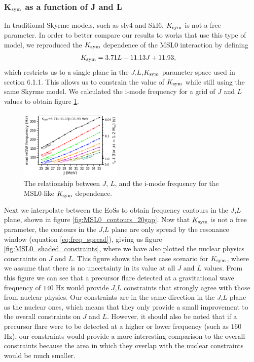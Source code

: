 \documentclass[fleqn,usenatbib]{mnras}
\begin{document}
\subsubsection{K$_{\rm sym}$ as a function of J and L}
\hspace{\parindent}In traditional Skyrme models, such as sly4 and SkI6, $K_{\rm sym}$ is not a free parameter. In order to better compare our results to works that use this type of model, we reproduced the $K_{\rm sym}$ dependence of the MSL0 interaction \citet{chen2010density} by defining \citet{newton2020nuclear}
\begin{align}
K_{\rm sym}=3.71L-11.13J+11.93,
\end{align}
\noindent which restricts us to a single plane in the $J$,$L$,$K_{\rm sym}$ parameter space used in section 6.1.1. This allows us to constrain the value of $K_{\rm sym}$ while still using the same Skyrme model. We calculated the i-mode frequency for a grid of $J$ and $L$ values to obtain figure \ref{fig:MSL0_J_L_f_tc}.

\begin{figure}
\centering
\includegraphics[width=0.45\textwidth,angle=0]{MSL0_J_L_f_tc}
\caption{The relationship between $J$, $L$, and the i-mode frequency for the MSL0-like $K_{\rm sym}$ dependence.}
\label{fig:MSL0_J_L_f_tc}
\end{figure}

\hspace{\parindent}Next we interpolate between the EoSs to obtain frequency contours in the $J$,$L$ plane, shown in figure \ref{fig:MSL0_contours_20gap}. Now that $K_{\rm sym}$ is not a free parameter, the contours in the $J$,$L$ plane are only spread by the resonance window (equation \ref{eq:freq_spread}), giving us figure \ref{fig:MSL0_shaded_constraints}, where we have also plotted the nuclear physics constraints on $J$ and $L$. This figure shows the best case scenario for $K_{\rm sym}$, where we assume that there is no uncertainty in its value at all $J$ and $L$ values. From this figure we can see that a precursor flare detected at a gravitational wave frequency of $140$ Hz would provide $J$,$L$ constraints that strongly agree with those from nuclear physics. Our constraints are in the same direction in the $J$,$L$ plane as the nuclear ones, which means that they only provide a small improvement to the overall constraints on $J$ and $L$. However, it should also be noted that if a precursor flare were to be detected at a higher or lower frequency (such as $160$ Hz), our constraints would provide a more interesting comparison to the overall constraints because the area in which they overlap with the nuclear constraints would be much smaller.
\end{document}
